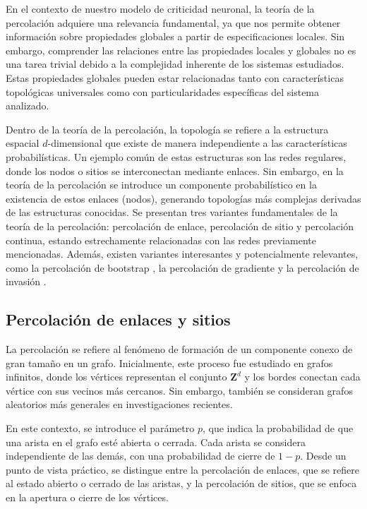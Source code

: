 En el contexto de nuestro modelo de criticidad neuronal, la teoría de la percolación adquiere una relevancia fundamental, ya que nos permite obtener información sobre propiedades globales a partir de especificaciones locales. Sin embargo, comprender las relaciones entre las propiedades locales y globales no es una tarea trivial debido a la complejidad inherente de los sistemas estudiados. Estas propiedades globales pueden estar relacionadas tanto con características topológicas universales como con particularidades específicas del sistema analizado.

Dentro de la teoría de la percolación, la topología se refiere a la estructura espacial $d$-dimensional que existe de manera independiente a las características probabilísticas. Un ejemplo común de estas estructuras son las redes regulares, donde los nodos o sitios se interconectan mediante enlaces. Sin embargo, en la teoría de la percolación se introduce un componente probabilístico en la existencia de estos enlaces (nodos), generando topologías más complejas derivadas de las estructuras conocidas. Se presentan tres variantes fundamentales de la teoría de la percolación: percolación de enlace, percolación de sitio y percolación continua, estando estrechamente relacionadas con las redes previamente mencionadas. Además, existen variantes interesantes y potencialmente relevantes, como la percolación de bootstrap \cite{chalupa_bootstrap_1979}, la percolación de gradiente \cite{rosso_gradient_1986} y la percolación de invasión \cite{chandler_capillary_1982,nickel_invasion_1983,wilkinson_invasion_1983}.


\subsection{Percolación de enlaces y sitios}\label{sec:percolacion}



La percolación se refiere al fenómeno de formación de un componente conexo de gran tamaño en un grafo. Inicialmente, este proceso fue estudiado en grafos infinitos, donde los vértices representan el conjunto $\mathbf{Z}^d$  y los bordes conectan cada vértice con sus vecinos más cercanos. Sin embargo, también se consideran grafos aleatorios más generales en investigaciones recientes.

En este contexto, se introduce el parámetro $p$, que indica la probabilidad de que una arista en el grafo esté abierta o cerrada. Cada arista se considera independiente de las demás, con una probabilidad de cierre de $1-p$. Desde un punto de vista práctico, se distingue entre la percolación de enlaces, que se refiere al estado abierto o cerrado de las aristas, y la percolación de sitios, que se enfoca en la apertura o cierre de los vértices.

